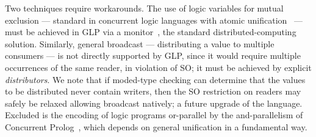 Two techniques require workarounds. The use of logic variables for mutual exclusion --- standard in concurrent logic languages with atomic unification~\cite{shapiro1989family} --- must be achieved in GLP via a monitor~\cite{hoare1974monitors,hansen1973operating}, the standard distributed-computing solution. Similarly, general broadcast --- distributing a value to multiple consumers --- is not directly supported by GLP, since it would require multiple occurrences of the same reader, in violation of SO; it must be achieved by explicit \emph{distributors}.  We note that if moded-type checking can determine that the values to be distributed never contain writers, then the SO restriction on readers may safely be relaxed allowing broadcast natively; a future upgrade of the language.  Excluded is the encoding of logic programs or-parallel by the and-parallelism of Concurrent Prolog~\cite{codish1986compiling,shapiro1989or}, which depends on general unification in a fundamental way.




